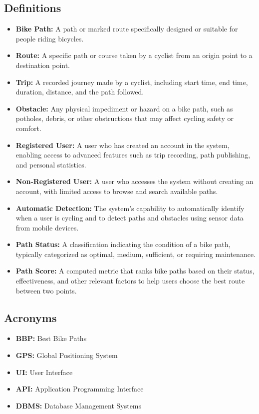 \subsection{Definitions}
\label{subsec:definitions}%
\begin{itemize}
    \item \textbf{Bike Path:} A path or marked route specifically designed or suitable for people riding bicycles.
    \item \textbf{Route:} A specific path or course taken by a cyclist from an origin point to a destination point.
    \item \textbf{Trip:} A recorded journey made by a cyclist, including start time, end time, duration, distance, and the path followed.
    \item \textbf{Obstacle:} Any physical impediment or hazard on a bike path, such as potholes, debris, or other obstructions that may affect cycling safety or comfort.
    \item \textbf{Registered User:} A user who has created an account in the system, enabling access to advanced features such as trip recording, path publishing, and personal statistics.
    \item \textbf{Non-Registered User:} A user who accesses the system without creating an account, with limited access to browse and search available paths.
    \item \textbf{Automatic Detection:} The system's capability to automatically identify when a user is cycling and to detect paths and obstacles using sensor data from mobile devices.
    \item \textbf{Path Status:} A classification indicating the condition of a bike path, typically categorized as optimal, medium, sufficient, or requiring maintenance.
    \item \textbf{Path Score:} A computed metric that ranks bike paths based on their status, effectiveness, and other relevant factors to help users choose the best route between two points.
\end{itemize}

\subsection{Acronyms}
\label{subsec:acronyms}%
\begin{itemize}
    \item \textbf{BBP:} Best Bike Paths
    \item \textbf{GPS:} Global Positioning System
    \item \textbf{UI:} User Interface
    \item \textbf{API:} Application Programming Interface
    \item \textbf{DBMS:} Database Management Systems
\end{itemize}


